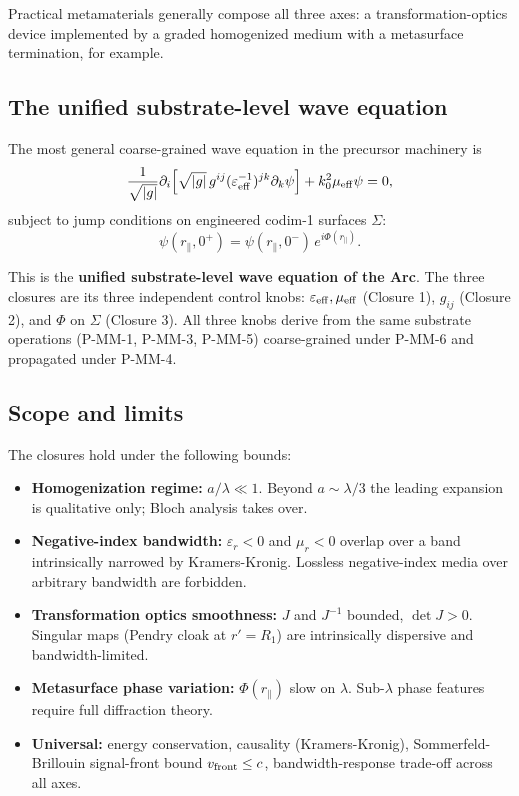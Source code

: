 \documentclass[11pt,a4paper]{article}
\begin{document}
Practical metamaterials generally compose all three axes: a transformation-optics device implemented by a graded homogenized medium with a metasurface termination, for example.

\subsection{The unified substrate-level wave equation}

The most general coarse-grained wave equation in the precursor machinery is
\[
\frac{1}{\sqrt{|g|}}\partial_i\!\left[\sqrt{|g|}\,g^{ij}(\varepsilon_{\rm eff}^{-1})^{jk}\partial_k\psi\right] + k_0^2\mu_{\rm eff}\psi = 0,
\]
subject to jump conditions on engineered codim-1 surfaces $\Sigma$:
\[
\psi(r_\parallel, 0^+) = \psi(r_\parallel, 0^-)\,e^{i\Phi(r_\parallel)}.
\]

This is the \textbf{unified substrate-level wave equation of the Arc}. The three closures are its three independent control knobs: $\varepsilon_{\rm eff}, \mu_{\rm eff}$ (Closure 1), $g_{ij}$ (Closure 2), and $\Phi$ on $\Sigma$ (Closure 3). All three knobs derive from the same substrate operations (P-MM-1, P-MM-3, P-MM-5) coarse-grained under P-MM-6 and propagated under P-MM-4.

\subsection{Scope and limits}

The closures hold under the following bounds:

\begin{itemize}[noitemsep]
\item \textbf{Homogenization regime:} $a/\lambda \ll 1$. Beyond $a \sim \lambda/3$ the leading expansion is qualitative only; Bloch analysis takes over.
\item \textbf{Negative-index bandwidth:} $\varepsilon_r < 0$ and $\mu_r < 0$ overlap over a band intrinsically narrowed by Kramers-Kronig. Lossless negative-index media over arbitrary bandwidth are forbidden.
\item \textbf{Transformation optics smoothness:} $J$ and $J^{-1}$ bounded, $\det J > 0$. Singular maps (Pendry cloak at $r' = R_1$) are intrinsically dispersive and bandwidth-limited.
\item \textbf{Metasurface phase variation:} $\Phi(r_\parallel)$ slow on $\lambda$. Sub-$\lambda$ phase features require full diffraction theory.
\item \textbf{Universal:} energy conservation, causality (Kramers-Kronig), Sommerfeld-Brillouin signal-front bound $v_{\rm front} \le c$, bandwidth-response trade-off across all axes.
\end{itemize}
\end{document}
